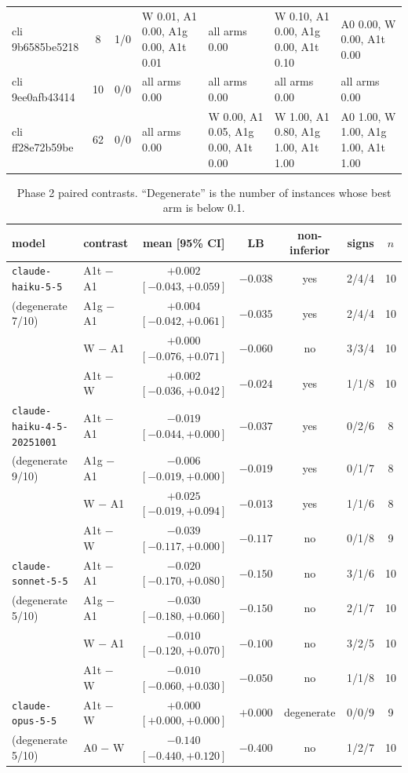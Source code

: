 \documentclass[11pt,a4paper]{article}
\begin{document}
\begin{table}[h]
\begin{tabular}{l c c p{3.2cm} p{3.0cm} p{3.0cm} p{3.0cm}}
cli 9b6585be5218 & 8 & 1/0 & W 0.01, A1 0.00, A1g 0.00, A1t 0.01 & all arms 0.00 & W 0.10, A1 0.00, A1g 0.00, A1t 0.10 & A0 0.00, W 0.00, A1t 0.00\\
cli 9ee0afb43414 & 10 & 0/0 & all arms 0.00 & all arms 0.00 & all arms 0.00 & all arms 0.00\\
cli ff28e72b59be & 62 & 0/0 & all arms 0.00 & W 0.00, A1 0.05, A1g 0.00, A1t 0.00 & W 1.00, A1 0.80, A1g 1.00, A1t 1.00 & A0 1.00, W 1.00, A1g 1.00, A1t 1.00\\
\bottomrule
\end{tabular}
\end{table}

\begin{table}[h]
\centering
\caption{Phase 2 paired contrasts. ``Degenerate'' is the number of instances whose best arm is below 0.1.}
\label{tab:p2}
\small
\begin{tabular}{llccccc}
\toprule
model & contrast & mean [95\% CI] & LB & non-inferior & signs & $n$\\
\midrule
\texttt{claude-haiku-5-5} & A1t $-$ A1 & $+0.002$ $[-0.043, +0.059]$ & $-0.038$ & yes & 2/4/4 & 10\\
(degenerate 7/10) & A1g $-$ A1 & $+0.004$ $[-0.042, +0.061]$ & $-0.035$ & yes & 2/4/4 & 10\\
 & W $-$ A1 & $+0.000$ $[-0.076, +0.071]$ & $-0.060$ & no & 3/3/4 & 10\\
 & A1t $-$ W & $+0.002$ $[-0.036, +0.042]$ & $-0.024$ & yes & 1/1/8 & 10\\
\midrule
\texttt{claude-haiku-4-5-20251001} & A1t $-$ A1 & $-0.019$ $[-0.044, +0.000]$ & $-0.037$ & yes & 0/2/6 & 8\\
(degenerate 9/10) & A1g $-$ A1 & $-0.006$ $[-0.019, +0.000]$ & $-0.019$ & yes & 0/1/7 & 8\\
 & W $-$ A1 & $+0.025$ $[-0.019, +0.094]$ & $-0.013$ & yes & 1/1/6 & 8\\
 & A1t $-$ W & $-0.039$ $[-0.117, +0.000]$ & $-0.117$ & no & 0/1/8 & 9\\
\midrule
\texttt{claude-sonnet-5-5} & A1t $-$ A1 & $-0.020$ $[-0.170, +0.080]$ & $-0.150$ & no & 3/1/6 & 10\\
(degenerate 5/10) & A1g $-$ A1 & $-0.030$ $[-0.180, +0.060]$ & $-0.150$ & no & 2/1/7 & 10\\
 & W $-$ A1 & $-0.010$ $[-0.120, +0.070]$ & $-0.100$ & no & 3/2/5 & 10\\
 & A1t $-$ W & $-0.010$ $[-0.060, +0.030]$ & $-0.050$ & no & 1/1/8 & 10\\
\midrule
\texttt{claude-opus-5-5} & A1t $-$ W & $+0.000$ $[+0.000, +0.000]$ & $+0.000$ & degenerate & 0/0/9 & 9\\
(degenerate 5/10) & A0 $-$ W & $-0.140$ $[-0.440, +0.120]$ & $-0.400$ & no & 1/2/7 & 10\\
\bottomrule
\end{tabular}
\end{table}
\end{document}
